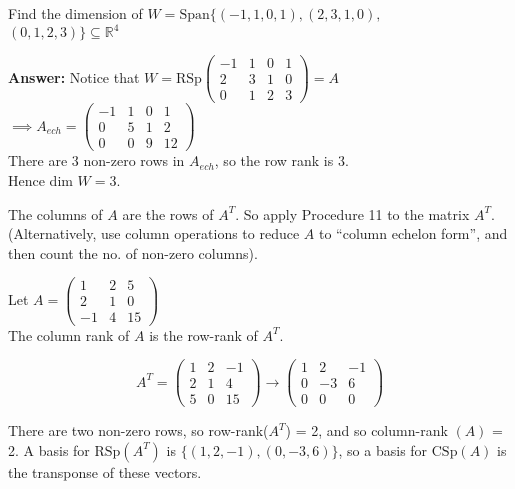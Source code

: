 \begin{example} Find the dimension of $W = \text{Span}\{(-1,1,0,1),(2,3,1,0),$\\$(0,1,2,3)\} \subseteq \mathbb{R}^4$

 \textbf{Answer:} Notice that $W = \text{RSp} \begin{pmatrix}
 -1 & 1 & 0 & 1\\ 2 & 3 & 1 & 0\\ 0 & 1 & 2 & 3
 \end{pmatrix} = A$\\
 
 $\implies A_{ech} =  
 \begin{pmatrix}
 -1 & 1 & 0 & 1 \\ 0 & 5 & 1 & 2 \\ 0 & 0 & 9 & 12
 \end{pmatrix}
 $\\
 
There are 3 non-zero rows in $A_{ech}$, so the row rank is 3.\\ Hence dim $W = 3$.
\end{example}\vspace*{10pt}

\begin{proc}The columns of $A$ are the rows of $A^T$. So apply Procedure 11 to the matrix $A^T$. (Alternatively, use column operations to reduce $A$ to ``column echelon form'', and then count the no. of non-zero columns).\end{proc}

\begin{example} Let $A = \begin{pmatrix}
 1 & 2 & 5\\ 2 & 1 & 0\\ -1 &4 & 15
 \end{pmatrix}
 $\\
 
 The column rank of $A$ is the row-rank of $A^T$.
 
 \[A^T = \begin{pmatrix}
 1 & 2 & -1\\ 2 & 1 & 4\\ 5 & 0 & 15
 \end{pmatrix}
 \to 
 \begin{pmatrix}
 1 & 2 & -1\\ 0 & -3 & 6\\ 0 & 0 & 0
 \end{pmatrix}\]
 
 There are two non-zero rows, so row-rank($A^T$) = 2, and so column-rank $(A)$ = 2. A basis for $\text{RSp}(A^T)$ is $\{(1,2,-1),(0,-3,6)\}$, so a basis for $\text{CSp}(A)$ is the transponse of these vectors.
 \end{example}
 
